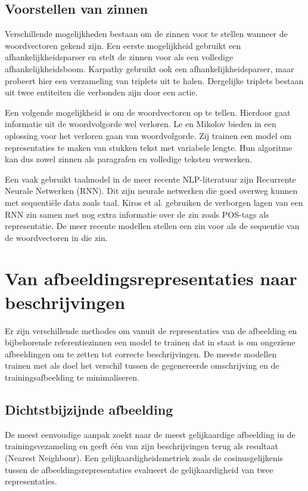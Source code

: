 \subsection{Voorstellen van zinnen}
 Verschillende mogelijkheden bestaan om de zinnen voor te stellen wanneer de woordvectoren gekend zijn. Een eerste mogelijkheid gebruikt een afhankelijkheidsparser en stelt de zinnen voor als een volledige afhankelijkheidsboom\cite{Socher2014}. Karpathy\cite{Karpathy2014} gebruikt ook een afhankelijkheidsparser, maar probeert hier een verzameling van triplets uit te halen. Dergelijke triplets bestaan uit twee entiteiten die verbonden zijn door een actie. 

 Een volgende mogelijkheid is om de woordvectoren op te tellen.\cite{Lebret2013} Hierdoor gaat informatie uit de woordvolgorde wel verloren. Le en Mikolov bieden in \cite{Le2014a} een oplossing voor het verloren gaan van woordvolgorde. Zij trainen een model om representaties te maken van stukken tekst met variabele lengte. Hun algoritme kan dus zowel zinnen als paragrafen en volledige teksten verwerken.

 Een vaak gebruikt taalmodel in de meer recente NLP-literatuur zijn Recurrente Neurale Netwerken (RNN).\cite{Mikolov2010} Dit zijn neurale netwerken die goed overweg kunnen met sequenti\"ele data zoals taal. Kiros et al.\cite{Kiros2013} gebruiken  de verborgen lagen van een RNN zin samen met nog extra informatie over de zin zoals POS-tags als representatie. De meer recente modellen stellen een zin voor als de sequentie van de woordvectoren in die zin.
 
\section{Van afbeeldingsrepresentaties naar beschrijvingen}
Er zijn verschillende methodes om vanuit de representaties van de afbeelding en bijbehorende referentiezinnen een model te trainen dat in staat is om ongeziene afbeeldingen om te zetten tot correcte beschrijvingen. 
De meeste modellen trainen met als doel het verschil tussen de gegenereerde omschrijving en de trainingsafbeelding te minimaliseren.

\subsection{Dichtstbijzijnde afbeelding}
De meest eenvoudige aanpak zoekt naar de meest gelijkaardige afbeelding in de trainingsvezameling en geeft \'e\'en van zijn beschrijvingen terug als resultaat (Nearest Neighbour)\cite{Devlin2015a}. Een gelijkaardigheidsmetriek zoals de cosinusgelijkenis tussen de afbeeldingsrepresentaties evalueert de gelijkaardigheid van twee representaties.

